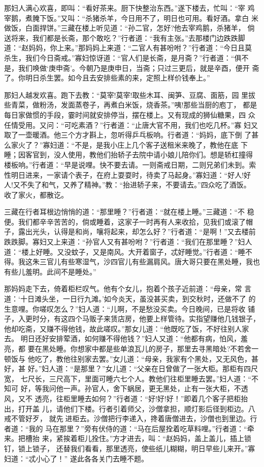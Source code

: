 那妇人满心欢喜，即叫：“看好茶来。厨下快整治东西。”遂下楼去，忙叫：“宰
鸡宰鹅，煮腌下饭。”又叫：“杀猪杀羊，今日用不了，明日也可用。看好酒。拿白
米做饭，白面捍饼。”三藏在楼上听见道：“孙二官，怎好?他去宰鸡鹅，杀猪羊，
倘送将来，我们都是长斋，那个敢吃？”行者道：“我有主张。”去那楼门边跌跌脚
道：“赵妈妈，你上来。”那妈妈上来道：“二官人有甚吩咐？”行者道：“今日且莫
杀生，我们今日斋戒。”寡妇惊讶道：“官人们是长斋，是月斋？”行者道：“俱不
是，我们唤做‘庚申斋’。今朝乃是庚申日，当斋；只过三更后，就是辛酉，便开
斋了。你明日杀生罢。如今且去安排些素的来，定照上样价钱奉上。”

那妇人越发欢喜。跑下去教：“莫宰!莫宰!取些木耳、闽笋、豆腐、面筋，园
里拔些青菜，做粉汤，发面蒸卷子，再煮白米饭，烧香茶。”咦!那些当厨的庖丁，
都是每日家做惯的手段，霎时间就安排停当，摆在楼上。又有现成的狮仙糖果，四
众任情受用。又问：“可吃素酒？”行者道：“止唐大官不用，我们也吃几杯。”寡
妇又取了一壶暖酒。他三个方才斟上，忽听得乒乓板响。行者道：“妈妈，底下倒
了甚么家火了？”寡妇道：“不是，是我小庄上几个客子送租米来晚了，教他在底
下睡；因客官到，没人使用，教他们抬轿子去院中请小娘儿陪你们。想是轿杠撞得
楼板响。”行者道：“早是说哩。快不要去请。一则斋戒日期，二则兄弟们未到。索
性明日进来，一家请个表子，在府上耍耍时，待卖了马起身。”寡妇道：“好人!好
人!又不失了和气，又养了精神。”教：“抬进轿子来，不要请去。”四众吃了酒饭。
收了家火，都散讫。

三藏在行者耳根边悄悄的道：“那里睡？”行者道：“就在楼上睡。”三藏道：“不
稳便。我们都辛辛苦苦的，倘或睡着，这家子一时再有人来收拾，见我们或滚了帽
子，露出光头，认得是和尚，嚷将起来，却怎么好？”行者道：“是啊！”又去楼前
跌跌脚。寡妇又上来道：“孙官人又有甚吩咐？”行者道：“我们在那里睡？”妇人
道：“楼上好睡。又没蚊子，又是南风。大开着窗子，忒好睡觉。”行者道：“睡不
得。我这朱三官儿有些寒湿气，沙四官儿有些漏肩风。唐大哥只要在黑处睡，我也
有些儿羞明。此间不是睡处。”

那妈妈走下去，倚着柜栏叹气。他有个女儿，抱着个孩子近前道：“母亲，常
言道：‘十日滩头坐，一日行九滩。’如今炎天，虽没甚买卖，到交秋时，还做不了
的生意哩。你嗟叹怎么？”妇人道：“儿啊，不是愁没买卖。今日晚间，已是将收
铺子，入更时分，有这四个马贩子来赁店房，他要上样管待。实指望赚他几钱银子，
他却吃斋，又赚不得他钱，故此嗟叹。”那女儿道：“他既吃了饭，不好往别人家去。
明日还好安排荤酒，如何赚不得他钱？”妇人又道：“他都有病，怕风，羞亮，都
要在黑处睡。你想家中都是些单浪瓦儿的房子，那里去寻黑暗处?不若舍一顿饭与
他吃了，教他往别家去罢。”女儿道：“母亲，我家有个黑处，又无风色，甚好，甚
好。”妇人道：“是那里？”女儿道：“父亲在日曾做了一张大柜。那柜有四尺宽，
七尺长，三尺高下，里面可睡六七个人。教他们往柜里睡去罢。”妇人道：“不知可
好，等我问他一声。孙官人，舍下蜗居，更无黑处，止有一张大柜，不透风，又不
透亮，往柜里睡去如何？”行者道：“好!好!好！”即着几个客子把柜抬出，打开盖
儿，请他们下楼。行者引着师父，沙僧拿担，顺灯影后径到柜边。八戒不管好歹，
就先进柜去。沙僧把行李递入，搀着唐僧进去，沙僧也到里边。行者道：“我的
马在那里？”旁有伏侍的道：“马在后屋拴着吃草料哩。”行者道：“牵来。把槽抬
来，紧挨着柜儿拴住。”方才进去，叫：“赵妈妈，盖上盖儿，插上锁钉，锁上锁子，
还替我们看看，那里透亮，使些纸儿糊糊，明日早些儿来开。”寡妇道：“忒小心了！”
遂此各各关门去睡不题。

